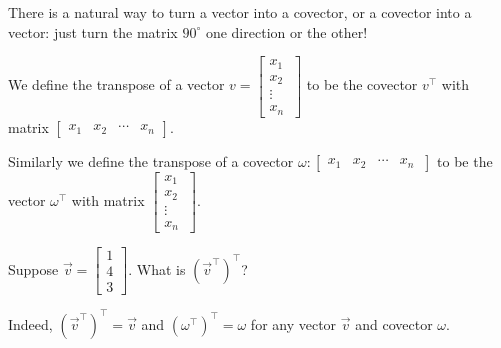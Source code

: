 \begin{ximera}
There is a natural way to turn a vector into a covector, or a covector into a vector:  just turn the matrix $90^\circ$ one direction or the other!

\begin{definition}
  We define the transpose of a vector $v = \begin{bmatrix} x_1 \\x_2\\ \vdots \\ x_n\ \end{bmatrix}$ to be the covector $v^\top$ with matrix 
  $\begin{bmatrix} x_1 &x_2& \cdots &x_n \end{bmatrix}$.
	
  Similarly we define the transpose of a covector $\omega: \begin{bmatrix} x_1 &x_2& \cdots &x_n\ \end{bmatrix}$ to be the vector $\omega^\top$ with matrix
  $\begin{bmatrix} x_1 \\x_2\\ \vdots \\ x_n\ \end{bmatrix}$.  
\end{definition}

\begin{question}
  Suppose $\vec{v} = \begin{bmatrix} 1 \\ 4 \\ 3 \end{bmatrix}$.  What is $(\vec{v}^\top)^\top$?

  \begin{solution}
    \begin{multiple-choice}
    \end{multiple-choice}
  \end{solution}

  Indeed, $(\vec{v}^\top)^\top = \vec{v}$ and $(\omega^\top)^\top = \omega$ for any vector $\vec{v}$ and covector $\omega$.


\end{question}
\end{ximera}
